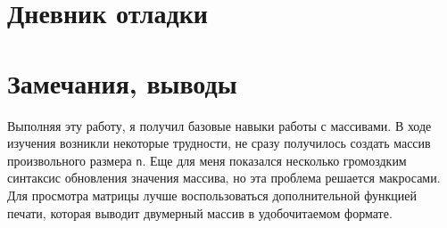 \documentclass[a4paper, 12pt]{article}
\begin{document}
\section{Дневник отладки}

\section{Замечания, выводы}
Выполняя эту работу, я получил базовые навыки работы с массивами. В ходе изучения возникли некоторые трудности, не сразу получилось создать массив произвольного размера {\tt n}. Еще для меня показался несколько громоздким синтаксис обновления значения массива, но эта проблема решается макросами. Для просмотра матрицы лучше воспользоваться дополнительной функцией печати, которая выводит двумерный массив в удобочитаемом формате.
\end{document}
